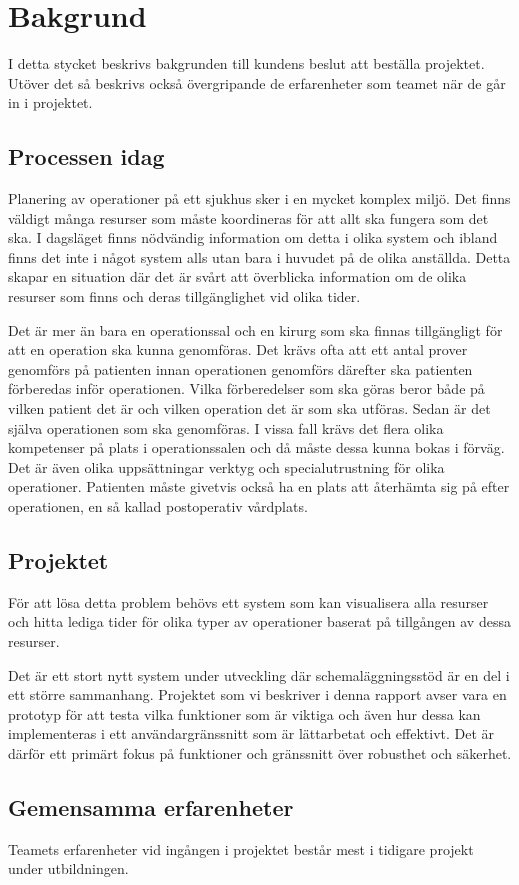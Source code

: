 \chapter{Bakgrund}
I detta stycket beskrivs bakgrunden till kundens beslut att beställa projektet.
Utöver det så beskrivs också övergripande de erfarenheter som teamet när de går
in i projektet.

\section{Processen idag}
Planering av operationer på ett sjukhus sker i en mycket komplex miljö. Det
finns väldigt många resurser som måste koordineras för att allt ska fungera som
det ska.
I dagsläget finns nödvändig information om detta i olika system och ibland finns
det inte i något system alls utan bara i huvudet på de olika anställda. Detta
skapar en situation där det är svårt att överblicka information om de olika
resurser som finns och deras tillgänglighet vid olika tider.

Det är mer än bara en operationssal och en kirurg som ska finnas tillgängligt
för att en operation ska kunna genomföras. Det krävs ofta att ett antal prover
genomförs på patienten innan operationen genomförs därefter ska patienten
förberedas inför operationen. Vilka förberedelser som ska göras beror både på
vilken patient det är och vilken operation det är som ska utföras. Sedan är det
själva operationen som ska genomföras. I vissa fall krävs det flera olika
kompetenser på plats i operationssalen och då måste dessa kunna bokas i förväg.
Det är även olika uppsättningar verktyg och specialutrustning för olika
operationer.
Patienten måste givetvis också ha en plats att återhämta sig på efter
operationen, en så kallad postoperativ vårdplats.

\section{Projektet}
För att lösa detta problem behövs ett system som kan visualisera alla resurser
och hitta lediga tider för olika typer av operationer baserat på tillgången av
dessa resurser.

Det är ett stort nytt system under utveckling där schemaläggningsstöd är en del
i ett större sammanhang. Projektet som vi beskriver i denna rapport avser vara
en prototyp för att testa vilka funktioner som är viktiga och även hur dessa
kan implementeras i ett användargränssnitt som är lättarbetat och effektivt.
Det är därför ett primärt fokus på funktioner och gränssnitt över robusthet och
säkerhet.

\section{Gemensamma erfarenheter}
Teamets erfarenheter vid ingången i projektet består mest i tidigare projekt
under utbildningen.
